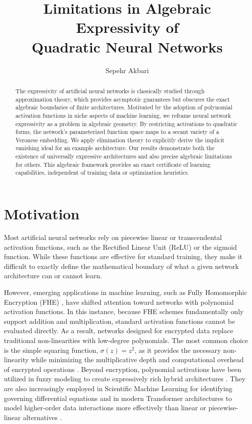 \documentclass[12pt]{amsproc}
\title[Expressivity of Neural Networks]{Limitations in Algebraic Expressivity of \\Quadratic Neural Networks}
\author{Sepehr Akbari}
\renewcommand{\-}{\setminus}
\newcommand\<{\langle}
\renewcommand\>{\rangle}
\theoremstyle{plain}
\theoremstyle{definition}
\theoremstyle{remark}
\begin{document}
\begin{abstract}
The expressivity of artificial neural networks is classically studied through approximation theory, which provides asymptotic guarantees but obscures the exact algebraic boundaries of finite architectures. Motivated by the adoption of polynomial activation functions in niche aspects of machine learning, we reframe neural network expressivity as a problem in algebraic geometry. By restricting activations to quadratic forms, the network's parameterized function space maps to a secant variety of a Veronese embedding. We apply elimination theory to explicitly derive the implicit vanishing ideal for an example architecture. Our results demonstrate both the existence of universally expressive architectures and also precise algebraic limitations for others. This algebraic framework provides an exact certificate of learning capabilities, independent of training data or optimization heuristics.
\end{abstract}

\maketitle

\section{Motivation}

Most artificial neural networks rely on piecewise linear or transcendental activation functions, such as the Rectified Linear Unit (ReLU) or the sigmoid function. While these functions are effective for standard training, they make it difficult to exactly define the mathematical boundary of what a given network architecture can or cannot learn. 

However, emerging applications in machine learning, such as Fully Homomorphic Encryption (FHE) \cite{gentry2009fhe}, have shifted attention toward networks with polynomial activation functions. In this instance, because FHE schemes fundamentally only support addition and multiplication, standard activation functions cannot be evaluated directly. As a result, networks designed for encrypted data replace traditional non-linearities with low-degree polynomials. The most common choice is the simple squaring function, $\sigma(z) = z^2$, as it provides the necessary non-linearity while minimizing the multiplicative depth and computational overhead of encrypted operations \cite{lee2021sisyphus}. Beyond encryption, polynomial activations have been utilized in fuzzy modeling to create expressively rich hybrid architectures \cite{park2002fuzzy}. They are also increasingly employed in Scientific Machine Learning for identifying governing differential equations \cite{petersen2023odes} and in modern Transformer architectures to model higher-order data interactions more effectively than linear or piecewise-linear alternatives \cite{zhuo2025polycom}.
\end{document}
